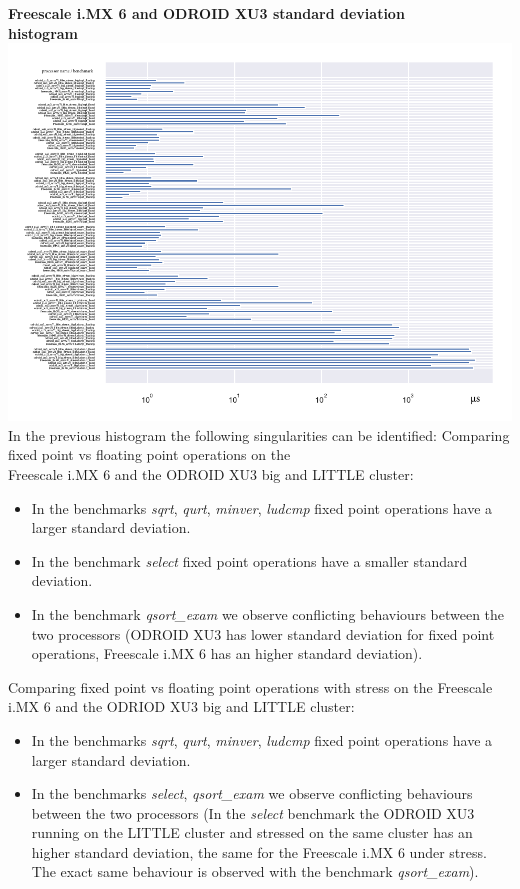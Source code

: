 \clearpage
\textbf{Freescale i.MX 6 and ODROID XU3 standard deviation\\ histogram}\newline
\hspace*{-3.2cm}
\includegraphics[width=570pt]{boards_stddev_histogram.pdf}\\[4cm]
In the previous histogram the following singularities can be identified:
Comparing fixed point vs floating point operations on the \\ Freescale i.MX 6 and the ODROID XU3 big and LITTLE cluster:
\begin{itemize}
		\item In the benchmarks \textit{sqrt}, \textit{qurt}, \textit{minver}, \textit{ludcmp} fixed point operations have a larger standard deviation.
		\item In the benchmark \textit{select} fixed point operations have a smaller standard deviation.
		\item In the benchmark \textit{qsort\_exam} we observe conflicting behaviours between the two processors (ODROID XU3 has lower standard deviation for fixed point operations, Freescale i.MX 6 has an higher standard deviation).
\end{itemize}
Comparing fixed point vs floating point operations with stress on the Freescale i.MX 6 and the ODRIOD XU3 big and LITTLE cluster:
\begin{itemize}
		\item In the benchmarks \textit{sqrt}, \textit{qurt}, \textit{minver}, \textit{ludcmp} fixed point operations have a larger standard deviation.
		\item In the benchmarks \textit{select}, \textit{qsort\_exam} we observe conflicting behaviours between the two processors (In the \textit{select} benchmark the ODROID XU3 running on the LITTLE cluster and stressed on the same cluster has an higher standard deviation, the same for the Freescale i.MX 6 under stress. The exact same behaviour is observed with the benchmark \textit{qsort\_exam}).
\end{itemize}

